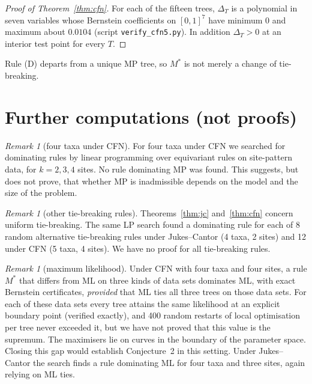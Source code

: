 \documentclass[11pt]{amsart}
\theoremstyle{definition}
\theoremstyle{remark}
\newtheorem{remark}[theorem]{Remark}
\begin{document}
\begin{proof}[Proof of Theorem~\ref{thm:cfn}]
For each of the fifteen trees, $\Delta_T$ is a polynomial in seven variables whose Bernstein coefficients on $[0,1]^7$ have minimum $0$ and maximum about $0.0104$ (script \texttt{verify\_cfn5.py}). In addition $\Delta_T>0$ at an interior test point for every $T$.
\end{proof}

Rule (D) departs from a unique MP tree, so $M^\ast$ is not merely a change of tie-breaking.

\section{Further computations (not proofs)}

\begin{remark}[four taxa under CFN]\label{rem:cfn4}
For four taxa under CFN we searched for dominating rules by linear programming over equivariant rules on site-pattern data, for $k=2,3,4$ sites. No rule dominating MP was found. This suggests, but does not prove, that whether MP is inadmissible depends on the model and the size of the problem.
\end{remark}

\begin{remark}[other tie-breaking rules]
Theorems~\ref{thm:jc} and~\ref{thm:cfn} concern uniform tie-breaking. The same LP search found a dominating rule for each of 8 random alternative tie-breaking rules under Jukes--Cantor (4 taxa, 2 sites) and 12 under CFN (5 taxa, 4 sites). We have no proof for all tie-breaking rules.
\end{remark}

\begin{remark}[maximum likelihood]
Under CFN with four taxa and four sites, a rule $M^\ast$ that differs from ML on three kinds of data sets dominates ML, with exact Bernstein certificates, \emph{provided} that ML ties all three trees on those data sets. For each of these data sets every tree attains the same likelihood at an explicit boundary point (verified exactly), and 400 random restarts of local optimisation per tree never exceeded it, but we have not proved that this value is the supremum. The maximisers lie on curves in the boundary of the parameter space. Closing this gap would establish Conjecture~2 in this setting. Under Jukes--Cantor the search finds a rule dominating ML for four taxa and three sites, again relying on ML ties.
\end{remark}
\end{document}
